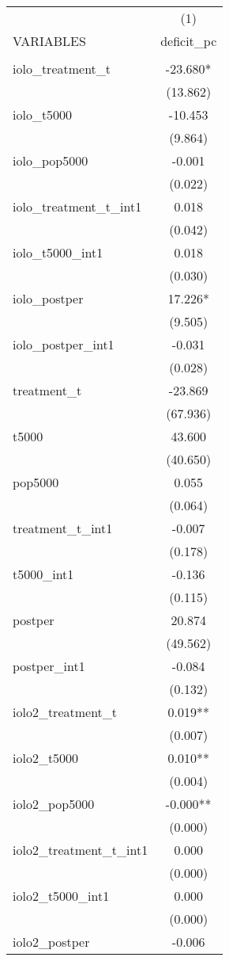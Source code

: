 \documentclass[]{article}
\begin{document}
\begin{tabular}{lc} \hline
 & (1) \\
VARIABLES & deficit\_pc \\ \hline
 &  \\
iolo\_treatment\_t & -23.680* \\
 & (13.862) \\
iolo\_t5000 & -10.453 \\
 & (9.864) \\
iolo\_pop5000 & -0.001 \\
 & (0.022) \\
iolo\_treatment\_t\_int1 & 0.018 \\
 & (0.042) \\
iolo\_t5000\_int1 & 0.018 \\
 & (0.030) \\
iolo\_postper & 17.226* \\
 & (9.505) \\
iolo\_postper\_int1 & -0.031 \\
 & (0.028) \\
treatment\_t & -23.869 \\
 & (67.936) \\
t5000 & 43.600 \\
 & (40.650) \\
pop5000 & 0.055 \\
 & (0.064) \\
treatment\_t\_int1 & -0.007 \\
 & (0.178) \\
t5000\_int1 & -0.136 \\
 & (0.115) \\
postper & 20.874 \\
 & (49.562) \\
postper\_int1 & -0.084 \\
 & (0.132) \\
iolo2\_treatment\_t & 0.019** \\
 & (0.007) \\
iolo2\_t5000 & 0.010** \\
 & (0.004) \\
iolo2\_pop5000 & -0.000** \\
 & (0.000) \\
iolo2\_treatment\_t\_int1 & 0.000 \\
 & (0.000) \\
iolo2\_t5000\_int1 & 0.000 \\
 & (0.000) \\
iolo2\_postper & -0.006 \\

\end{tabular}
\end{document}
